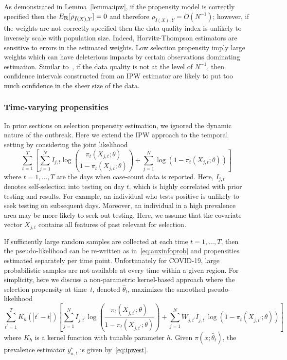 \documentclass[12pt]{amsart}
\numberwithin{equation}{section}
\theoremstyle{plain}
\begin{document}
As demonstrated in Lemma~\ref{lemma:ipw}, if the propensity model is correctly specified then the $E_{\bf R} [ \rho_{\tilde I (X), Y} ] = 0$ and therefore $\rho_{\tilde I(X), Y} = O(N^{-1})$; however, if the weights are not correctly specified then the data quality index is unlikely to inversely scale with population size.  Indeed, Horvitz-Thompson estimators are sensitive to errors in the estimated weights.  Low selection propensity imply large weights which can have deleterious impacts by certain observations dominating estimation.   Similar to~\cite{Meng2018}, if the data quality is not at the level of $N^{-1}$, then confidence intervals constructed from an IPW estimator are likely to put too much confidence in the sheer size of the data.

\subsubsection{Time-varying propensities}

In prior sections on selection propensity estimation, we ignored the dynamic nature of the outbreak.  Here we extend the IPW approach to the temporal setting by considering the joint likelihood
\begin{equation}
\label{eq:tvpropensity}
\sum_{t=1}^T \left[ \sum_{j=1}^N I_{j,t} \log \left( \frac{\pi_t (X_{j,t}; \theta)}{1-\pi_t(X_{j,t}; \theta)} \right) + \sum_{j=1}^N \log \left( 1 - \pi_t (X_{j,t}; \theta) \right) \right]
\end{equation}
where $t=1,\ldots,T$ are the days when case-count data is reported.  Here, $I_{j,t}$ denotes self-selection into testing on day $t$, which is highly correlated with prior testing and results.  For example, an individual who tests positive is unlikely to seek testing on subsequent days.  Moreover, an individual in a high prevalence area may be more likely to seek out testing.  Here, we assume that the covariate vector $X_{j,t}$ contains all features of past relevant for selection.

If sufficiently large random samples are collected at each time $t =1,\ldots,T$, then the pseudo-likelihood can be re-written as in~\eqref{eq:auxinfoprob} and propensities estimated separately per time point.  Unfortunately for COVID-19, large probabilistic samples are not available at every time within a given region.  For simplicity, here we discuss a non-parametric kernel-based approach where the selection propensity at time~$t$, denoted $\hat \theta_t$, maximizes the smoothed pseudo-likelihood
$$
\sum_{t^\prime=1}^T K_h(|t^\prime - t|) \left[ \sum_{j=1}^N I_{j,t^\prime} \log \left( \frac{\pi_t (X_{j,t^\prime}; \theta)}{1-\pi_t(X_{j,t^\prime}; \theta)} \right) + \sum_{j=1}^N \tilde W_{j,t^\prime} \tilde I_{j,t^\prime} \log \left( 1 - \pi_t (X_{j,t^\prime}; \theta) \right) \right]
$$
where $K_h$ is a kernel function with tunable parameter $h$. Given $\pi (x;\hat \theta_t)$, the prevalence estimator $\bar y_{n,t}^\star$ is given by~\ref{eq:ipwest}.
\end{document}
